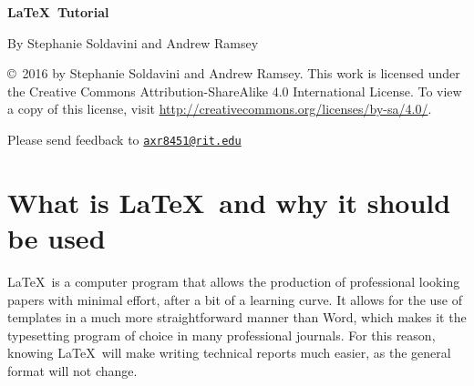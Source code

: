 \documentclass[11pt]{article}
\begin{document}
\vspace*{2.5cm} 

\begin{center}
    \LARGE
    \textbf{\LaTeX\ Tutorial}\\ 

    \medskip

    \large
    By Stephanie Soldavini and Andrew Ramsey 
\end{center}
\vfill

\copyright\ 2016 by Stephanie Soldavini and Andrew Ramsey. This work is licensed under the Creative Commons Attribution-ShareAlike 4.0 International License. To view a copy of this license, visit \url{http://creativecommons.org/licenses/by-sa/4.0/}.

Please send feedback to \href{mailto:axr8451@rit.edu}{\nolinkurl{axr8451@rit.edu}}

\newpage


\section*{What is \LaTeX\ and why it should be used}
\LaTeX\ is a computer program that allows the production of professional looking papers with minimal effort, after a bit of a learning curve. It allows for the use of templates in a much more straightforward manner than Word, which makes it the typesetting program of choice in many professional journals. For this reason, knowing \LaTeX\ will make writing technical reports much easier, as the general format will not change.
\end{document}
